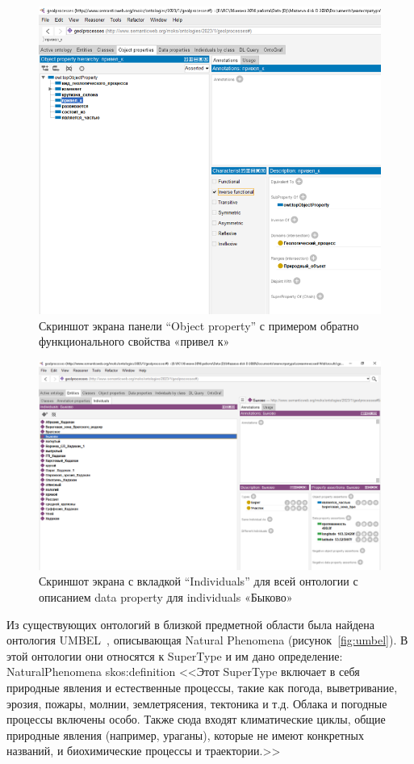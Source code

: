 \documentclass[732,fontsize=14pt,final]{studrep}
\begin{document}
  \begin{figure}[htp]
	\centering
	\includegraphics[width=0.9\linewidth]{pics/image7.png}
    \caption{Скриншот экрана панели “Object property” с примером обратно функционального свойства «привел к»}
    \label{fig:obj-prop-results}
  \end{figure}

  \begin{figure}[htp]
	\centering
	\includegraphics[width=0.9\linewidth]{pics/image5.png}
    \caption{Скриншот экрана с вкладкой “Individuals” для всей онтологии с описанием data property для individuals «Быково»}
    \label{fig:bykovo-instance}
  \end{figure}

Из существующих онтологий в близкой предметной области была найдена онтология UMBEL~\cite{umbel}, описывающая Natural Phenomena (рисунок~\ref{fig:umbel}). В этой онтологии они относятся к SuperType и им дано определение: NaturalPhenomena skos:definition <<Этот SuperType включает в себя природные явления и естественные процессы, такие как погода, выветривание, эрозия, пожары, молнии, землетрясения, тектоника и т.д. Облака и погодные процессы включены особо. Также сюда входят климатические циклы, общие природные явления (например, ураганы), которые не имеют конкретных названий, и биохимические процессы и траектории.>>
\end{document}
